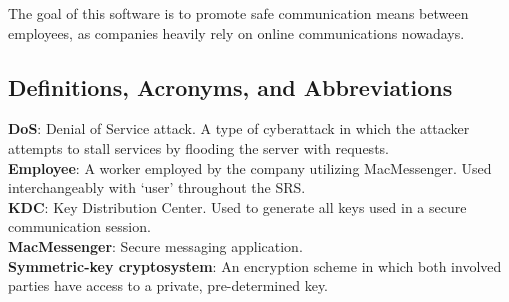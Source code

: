 \documentclass[]{article}
\begin{document}
The goal of this software is to promote safe communication means between employees, as companies heavily rely on online communications nowadays. 


\subsection{Definitions, Acronyms, and Abbreviations}
\label{sub:definitions_acronyms_and_abbreviations}
\textbf{DoS}: Denial of Service attack. A type of cyberattack in which the attacker attempts to stall services by flooding the server with requests.\vspace{2mm}\\
\textbf{Employee}: A worker employed by the company utilizing MacMessenger. Used interchangeably with ‘user’ throughout the SRS.\vspace{2mm}\\
\textbf{KDC}: Key Distribution Center. Used to generate all keys used in a secure communication session.\vspace{2mm}\\
\textbf{MacMessenger}: Secure messaging application.\vspace{2mm}\\
\textbf{Symmetric-key cryptosystem}: An encryption scheme in which both involved parties have access to a private, pre-determined key.\\

\end{document}
